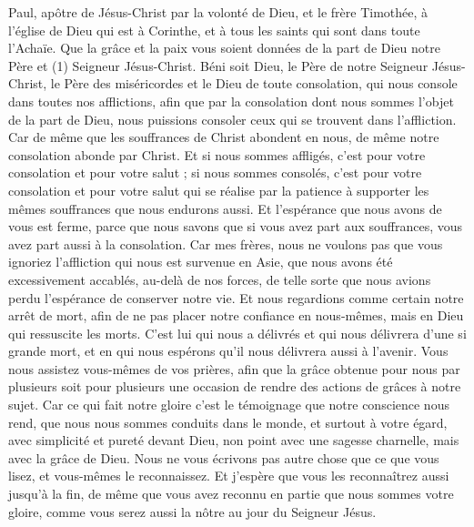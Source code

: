 \BFont
\begin{multicols}{2}
\TextTitle{[Salutation]}
\VerseOne{}Paul, apôtre de Jésus-Christ par la volonté de Dieu, et le frère Timothée, à l'église de Dieu qui est à Corinthe, et à tous les saints qui sont dans toute l'Achaïe.
Que la grâce et la paix vous soient données de la part de Dieu notre Père et (1) Seigneur Jésus-Christ.
Béni soit Dieu, le Père de notre Seigneur Jésus-Christ, le Père des miséricordes et le Dieu de toute consolation,
qui nous console dans toutes nos afflictions, afin que par la consolation dont nous sommes l’objet de la part de Dieu, nous puissions consoler ceux qui se trouvent dans l’affliction.
Car de même que les souffrances de Christ abondent en nous, de même notre consolation abonde par Christ.
Et si nous sommes affligés, c'est pour votre consolation et pour votre salut ; si nous sommes consolés, c'est pour votre consolation et pour votre salut qui se réalise par la patience à supporter les mêmes souffrances que nous endurons aussi.
Et l'espérance que nous avons de vous est ferme, parce que nous savons que si vous avez part aux souffrances, vous avez part aussi à la consolation.
Car mes frères, nous ne voulons pas que vous ignoriez l’affliction qui nous est survenue en Asie, que nous avons été excessivement accablés, au-delà de nos forces, de telle sorte que nous avions perdu l'espérance de conserver notre vie.
Et nous regardions comme certain notre arrêt de mort, afin de ne pas placer notre confiance en nous-mêmes, mais en Dieu qui ressuscite les morts.
C’est lui qui nous a délivrés et qui nous délivrera d'une si grande mort, et en qui nous espérons qu'il nous délivrera aussi à l'avenir.
Vous nous assistez vous-mêmes de vos prières, afin que la grâce obtenue pour nous par plusieurs soit pour plusieurs une occasion de rendre des actions de grâces à notre sujet.
Car ce qui fait notre gloire c’est le témoignage que notre conscience nous rend, que nous nous sommes conduits dans le monde, et surtout à votre égard, avec simplicité et pureté devant Dieu, non point avec une sagesse charnelle, mais avec la grâce de Dieu.
Nous ne vous écrivons pas autre chose que ce que vous lisez, et vous-mêmes le reconnaissez. Et j'espère que vous les reconnaîtrez aussi jusqu'à la fin,
de même que vous avez reconnu en partie que nous sommes votre gloire, comme vous serez aussi la nôtre au jour du Seigneur Jésus.

\end{multicols}
